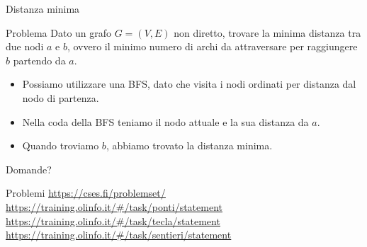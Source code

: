 \documentclass[compress]{beamer}
\begin{document}
\begin{frame}{Distanza minima}
    \begin{exampleblock}{Problema}
        Dato un grafo $G = (V, E)$ non diretto, trovare la minima distanza tra due nodi $a$ e $b$, ovvero il minimo numero di 
        archi da attraversare per raggiungere $b$ partendo da $a$.
    \end{exampleblock}
    \pause
    \begin{itemize}
        \item Possiamo utilizzare una BFS, dato che visita i nodi ordinati per distanza dal nodo di partenza.
        \pause
        \item Nella coda della BFS teniamo il nodo attuale e la sua distanza da $a$.
        \pause
        \item Quando troviamo $b$, abbiamo trovato la distanza minima.
    \end{itemize}
\end{frame}

\begin{frame}{Domande?}
  \tableofcontents
\end{frame}

\begin{frame}{Problemi}{}
    \underline{\url{https://cses.fi/problemset/}}
    \underline{\url{https://training.olinfo.it/\#/task/ponti/statement}}
    \underline{\url{https://training.olinfo.it/\#/task/tecla/statement}}
    \underline{\url{https://training.olinfo.it/\#/task/sentieri/statement}}
\end{frame}
\end{document}
